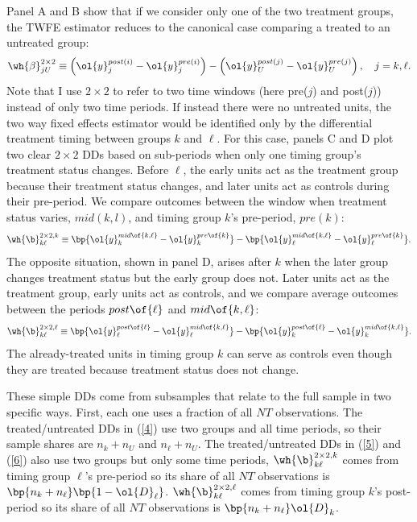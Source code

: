 \documentclass[12pt]{article}
\theoremstyle{definition}
\begin{document}
Panel A and B show that if we consider only one of the two treatment groups, the TWFE estimator reduces to the canonical case comparing a treated to an untreated group:
\begin{equation}
    \label{4}
    \wh{\beta}_{j U}^{2 \times 2} \equiv\left(\ol{y}_j^{{post }(i)}-\ol{y}_j^{{pre }(i)}\right)-\left(\ol{y}_U^{{post }(j)}-\ol{y}_U^{{pre }(j)}\right), \quad j=k, \ell .
\end{equation}
Note that I use $2 \times 2$ to refer to two time windows (here pre($j$) and post($j$)) instead of only two time periods. If instead there were no untreated units, the two way fixed effects estimator would be identified only by the differential treatment timing between groups $k$ and $\ell$. For this case, panels C and D plot two clear $2 \times 2$ DDs based on sub-periods when only one timing group's treatment status changes. Before $\ell$, the early units act as the treatment group because their treatment status changes, and later units act as controls during their pre-period. We compare outcomes between the window when treatment status varies, $mid(k, l)$, and timing group $k$'s pre-period, $pre(k)$: 
\begin{equation}
    \label{5}
    \wh{\b}_{k\ell}^{2\times 2, k} \equiv \bp{\ol{y}_{k}^{mid\of{k, \ell}} - \ol{y}_{k}^{pre\of{k}}} - \bp{\ol{y}_{\ell}^{mid\of{k, \ell}} - \ol{y}_{\ell}^{pre\of{k}}}.
\end{equation}
The opposite situation, shown in panel D, arises after $k$ when the later group changes treatment status but the early group does not. Later units act as the treatment group, early units act as controls, and we compare average outcomes between the periods $post\of{\ell}$ and $mid\of{k, \ell}$:
\begin{equation}
    \label{6}
    \wh{\b}_{k\ell}^{2\times 2, \ell} \equiv \bp{\ol{y}_{\ell}^{post\of{\ell}} - \ol{y}_{\ell}^{mid\of{k, \ell}}} - \bp{\ol{y}_{k}^{post\of{\ell}} - \ol{y}_{k}^{mid\of{k, \ell}}}.
\end{equation}
The already-treated units in timing group $k$ can serve as controls even though they are treated because treatment status does not change.

These simple DDs come from subsamples that relate to the full sample in two specific ways. First, each one uses a fraction of all $NT$ observations. The treated/untreated DDs in (\ref{4}) use two groups and all time periods, so their sample shares are $n_k + n_U$ and $n_{\ell} + n_U$. The treated/untreated DDs in (\ref{5}) and (\ref{6}) also use two groups but only some time periods, $\wh{\b}_{k\ell}^{2\times2, k}$ comes from timing group $\ell$'s pre-period so its share of all $NT$ observations is $\bp{n_k + n_{\ell}}\bp{1 - \ol{D}_\ell}$. $\wh{\b}_{k\ell}^{2\times2, \ell}$ comes from timing group $k$'s post-period so its share of all $NT$ observations is $\bp{n_k + n_\ell}\ol{D}_k$.
\end{document}
